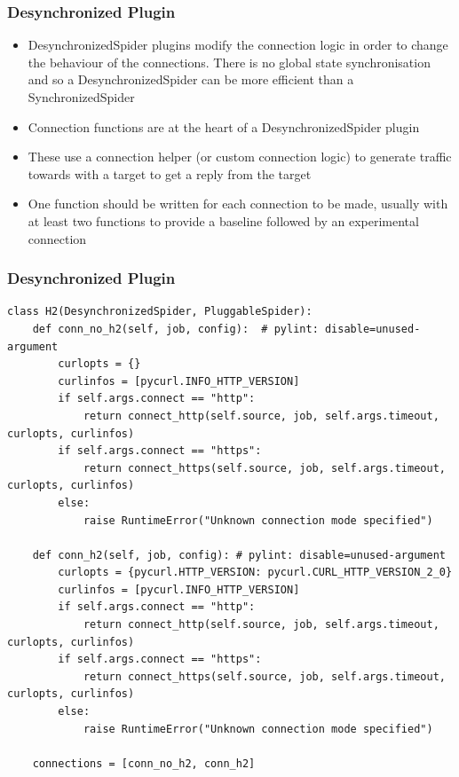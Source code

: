 \documentclass[handout,notes]{beamer}
\begin{document}
\begin{frame}
\frametitle{Desynchronized Plugin}
\begin{itemize}[<+->]
\item{DesynchronizedSpider plugins modify the connection logic in order to
change the behaviour of the connections. There is no global state
synchronisation and so a DesynchronizedSpider can be more efficient than a
SynchronizedSpider}
\item{Connection functions are at the heart of a DesynchronizedSpider plugin}
\item{These use a connection helper (or custom connection logic) to generate
traffic towards with a target to get a reply from the target}
\item{One function should be written for each connection to be made, usually
with at least two functions to provide a baseline followed by an experimental
connection}
\end{itemize}
\end{frame}

\begin{frame}[fragile]
\frametitle{Desynchronized Plugin}
\begin{lstlisting}[caption={Connection Functions for the H2 Plugin}]
class H2(DesynchronizedSpider, PluggableSpider):
    def conn_no_h2(self, job, config):  # pylint: disable=unused-argument
        curlopts = {}
        curlinfos = [pycurl.INFO_HTTP_VERSION]
        if self.args.connect == "http":
            return connect_http(self.source, job, self.args.timeout, curlopts, curlinfos)
        if self.args.connect == "https":
            return connect_https(self.source, job, self.args.timeout, curlopts, curlinfos)
        else:
            raise RuntimeError("Unknown connection mode specified")

    def conn_h2(self, job, config): # pylint: disable=unused-argument
        curlopts = {pycurl.HTTP_VERSION: pycurl.CURL_HTTP_VERSION_2_0}
        curlinfos = [pycurl.INFO_HTTP_VERSION]
        if self.args.connect == "http":
            return connect_http(self.source, job, self.args.timeout, curlopts, curlinfos)
        if self.args.connect == "https":
            return connect_https(self.source, job, self.args.timeout, curlopts, curlinfos)
        else:
            raise RuntimeError("Unknown connection mode specified")

    connections = [conn_no_h2, conn_h2]
\end{lstlisting}
\end{frame}
\end{document}
